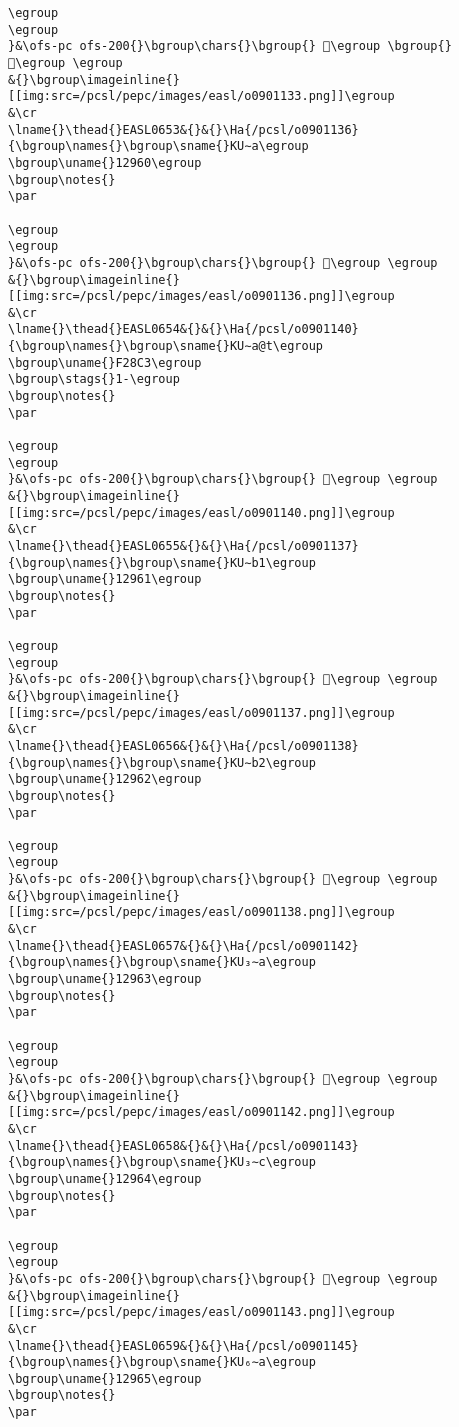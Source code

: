 \begin{verbatim}
\egroup
\egroup
}&\ofs-pc ofs-200{}\bgroup\chars{}\bgroup{} 𒥞\egroup \bgroup{} 𒥟\egroup \egroup
&{}\bgroup\imageinline{}[[img:src=/pcsl/pepc/images/easl/o0901133.png]]\egroup
&\cr
\lname{}\thead{}EASL0653&{}&{}\Ha{/pcsl/o0901136}{\bgroup\names{}\bgroup\sname{}KU∼a\egroup
\bgroup\uname{}12960\egroup
\bgroup\notes{}
\par 

\egroup
\egroup
}&\ofs-pc ofs-200{}\bgroup\chars{}\bgroup{} 𒥠\egroup \egroup
&{}\bgroup\imageinline{}[[img:src=/pcsl/pepc/images/easl/o0901136.png]]\egroup
&\cr
\lname{}\thead{}EASL0654&{}&{}\Ha{/pcsl/o0901140}{\bgroup\names{}\bgroup\sname{}KU∼a@t\egroup
\bgroup\uname{}F28C3\egroup
\bgroup\stags{}1-\egroup
\bgroup\notes{}
\par 

\egroup
\egroup
}&\ofs-pc ofs-200{}\bgroup\chars{}\bgroup{} 󲣃\egroup \egroup
&{}\bgroup\imageinline{}[[img:src=/pcsl/pepc/images/easl/o0901140.png]]\egroup
&\cr
\lname{}\thead{}EASL0655&{}&{}\Ha{/pcsl/o0901137}{\bgroup\names{}\bgroup\sname{}KU∼b1\egroup
\bgroup\uname{}12961\egroup
\bgroup\notes{}
\par 

\egroup
\egroup
}&\ofs-pc ofs-200{}\bgroup\chars{}\bgroup{} 𒥡\egroup \egroup
&{}\bgroup\imageinline{}[[img:src=/pcsl/pepc/images/easl/o0901137.png]]\egroup
&\cr
\lname{}\thead{}EASL0656&{}&{}\Ha{/pcsl/o0901138}{\bgroup\names{}\bgroup\sname{}KU∼b2\egroup
\bgroup\uname{}12962\egroup
\bgroup\notes{}
\par 

\egroup
\egroup
}&\ofs-pc ofs-200{}\bgroup\chars{}\bgroup{} 𒥢\egroup \egroup
&{}\bgroup\imageinline{}[[img:src=/pcsl/pepc/images/easl/o0901138.png]]\egroup
&\cr
\lname{}\thead{}EASL0657&{}&{}\Ha{/pcsl/o0901142}{\bgroup\names{}\bgroup\sname{}KU₃∼a\egroup
\bgroup\uname{}12963\egroup
\bgroup\notes{}
\par 

\egroup
\egroup
}&\ofs-pc ofs-200{}\bgroup\chars{}\bgroup{} 𒥣\egroup \egroup
&{}\bgroup\imageinline{}[[img:src=/pcsl/pepc/images/easl/o0901142.png]]\egroup
&\cr
\lname{}\thead{}EASL0658&{}&{}\Ha{/pcsl/o0901143}{\bgroup\names{}\bgroup\sname{}KU₃∼c\egroup
\bgroup\uname{}12964\egroup
\bgroup\notes{}
\par 

\egroup
\egroup
}&\ofs-pc ofs-200{}\bgroup\chars{}\bgroup{} 𒥤\egroup \egroup
&{}\bgroup\imageinline{}[[img:src=/pcsl/pepc/images/easl/o0901143.png]]\egroup
&\cr
\lname{}\thead{}EASL0659&{}&{}\Ha{/pcsl/o0901145}{\bgroup\names{}\bgroup\sname{}KU₆∼a\egroup
\bgroup\uname{}12965\egroup
\bgroup\notes{}
\par 


\end{verbatim}
